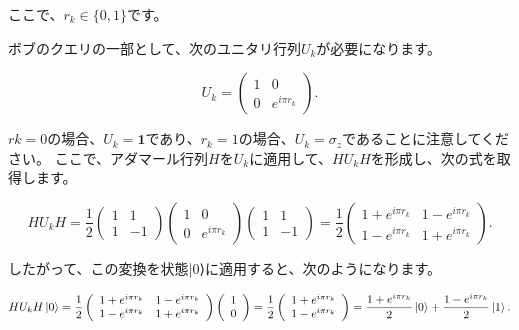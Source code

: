 ここで、$r_k \in \{0,1 \}$です。

ボブのクエリの一部として、次のユニタリ行列$U_k$が必要になります。

\begin{equation}
\label{176}
U_k = \left(  
\begin{array}{cc}
 1  & 0\\
 0  & e^{i \pi r_k}
\end{array}
\right).
\end{equation}

$rk = 0$の場合、$U_k = \mathbf{1}$であり、$r_k = 1$の場合、$U_k = \sigma_z$であることに注意してください。 ここで、アダマール行列$H$を$U_k$に適用して、$H U_k H$を形成し、次の式を取得します。

\begin{equation}
\label{177}
H  U_k  H = \frac{1}{2} \left(  
\begin{array}{cc}
 1  & 1\\
 1  & -1
\end{array}
\right)
\left(  
\begin{array}{cc}
 1  & 0\\
 0   & e^{i \pi r_k}
\end{array}
\right)
\left(  
\begin{array}{cc}
 1  & 1\\
 1   & -1
\end{array}
\right)
=
\frac{1}{2}
\left(  
\begin{array}{cc}
 1+e^{i \pi r_k}  & 1-e^{i \pi r_k}\\
 1-e^{i \pi r_k}  & 1+ e^{i \pi r_k}
\end{array}
\right).
\end{equation}

したがって、この変換を状態|0⟩に適用すると、次のようになります。


\begin{equation}
\label{178}
H  U_k  H \ket{0} 
= 
\frac{1}{2}
\left(  
\begin{array}{cc}
 1+e^{i \pi r_k}  & 1-e^{i \pi r_k}\\
 1-e^{i \pi r_k}  & 1+ e^{i \pi r_k}
\end{array}
\right)
\left(  
\begin{array}{c}
 1  \\
 0
\end{array}
\right)
=
\frac{1}{2}
\left(  
\begin{array}{cc}
 1+e^{i \pi r_k} \\
 1-e^{i \pi r_k}  
\end{array}
\right)
=
\frac{1 + e^{i \pi r_k}}{2} \ket{0}
+
\frac{1 - e^{i \pi r_k}}{2} \ket{1}.
\end{equation}

